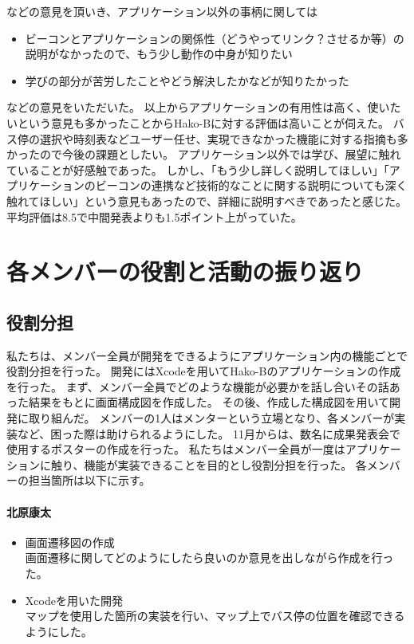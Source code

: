 \documentclass[openany,11pt,papersize]{jsbook}
\begin{document}
などの意見を頂いき、アプリケーション以外の事柄に関しては
\begin{itemize}

\item ビーコンとアプリケーションの関係性（どうやってリンク？させるか等）の説明がなかったので、もう少し動作の中身が知りたい
\item 学びの部分が苦労したことやどう解決したかなどが知りたかった

\end{itemize}
などの意見をいただいた。
以上からアプリケーションの有用性は高く、使いたいという意見も多かったことからHako-Bに対する評価は高いことが伺えた。
バス停の選択や時刻表などユーザー任せ、実現できなかった機能に対する指摘も多かったので今後の課題としたい。
アプリケーション以外では学び、展望に触れていることが好感触であった。
しかし、「もう少し詳しく説明してほしい」「アプリケーションのビーコンの連携など技術的なことに関する説明についても深く触れてほしい」という意見もあったので、詳細に説明すべきであったと感じた。
平均評価は8.5で中間発表よりも1.5ポイント上がっていた。



\chapter{各メンバーの役割と活動の振り返り}
\section{役割分担}
私たちは、メンバー全員が開発をできるようにアプリケーション内の機能ごとで役割分担を行った。
開発にはXcodeを用いてHako-Bのアプリケーションの作成を行った。
まず、メンバー全員でどのような機能が必要かを話し合いその話あった結果をもとに画面構成図を作成した。
その後、作成した構成図を用いて開発に取り組んだ。
メンバーの1人はメンターという立場となり、各メンバーが実装など、困った際は助けられるようにした。
11月からは、数名に成果発表会で使用するポスターの作成を行った。
私たちはメンバー全員が一度はアプリケーションに触り、機能が実装できることを目的とし役割分担を行った。
各メンバーの担当箇所は以下に示す。

\subsubsection{北原康太}
\begin{itemize}
  \item 画面遷移図の作成\\
    画面遷移に関してどのようにしたら良いのか意見を出しながら作成を行った。
	\item Xcodeを用いた開発\\
    マップを使用した箇所の実装を行い、マップ上でバス停の位置を確認できるようにした。
\end{itemize}
\end{document}
